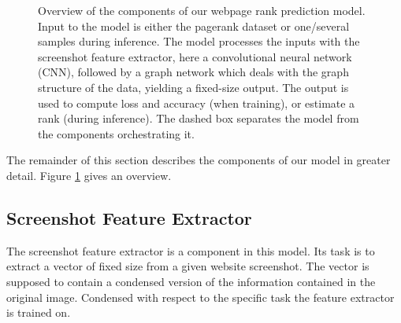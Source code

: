 \begin{figure}
    \centering

    \caption[Webpage rank prediction model architecture overview]{Overview of the components of our webpage rank prediction model. Input to the model is either the pagerank dataset or one/several samples during inference. The model processes the inputs with the screenshot feature extractor, here a convolutional neural network (CNN), followed by a graph network which deals with the graph structure of the data, yielding a fixed-size output. The output is used to compute loss and accuracy (when training), or estimate a rank (during inference). The dashed box separates the model from the components orchestrating it.}
    \label{fig:methodcomponents}
\end{figure}

The remainder of this section describes the components of our model in greater detail. Figure \ref{fig:methodcomponents} gives an overview.

\subsection{Screenshot Feature Extractor}

The screenshot feature extractor is a component in this model. Its task is to extract a vector of fixed size from a given website screenshot. The vector is supposed to contain a condensed version of the information contained in the original image. Condensed with respect to the specific task the feature extractor is trained on.

